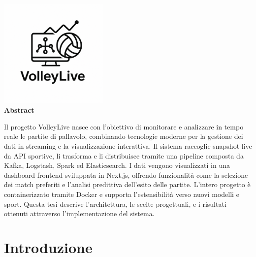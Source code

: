 \documentclass[a4paper,12pt]{report}
\begin{document}
\newpage
\thispagestyle{empty}
\vspace*{2cm}
\begin{center}
    \includegraphics[width=0.4\textwidth]{volleylive-logo.png} \\[1.5cm]
    \textbf{\LARGE Abstract} \\[1cm]
    \begin{minipage}{0.85\textwidth}
        \small
        Il progetto VolleyLive nasce con l’obiettivo di monitorare e analizzare in tempo reale le partite di pallavolo, combinando tecnologie moderne per la gestione dei dati in streaming e la visualizzazione interattiva. Il sistema raccoglie snapshot live da API sportive, li trasforma e li distribuisce tramite una pipeline composta da Kafka, Logstash, Spark ed Elasticsearch. I dati vengono visualizzati in una dashboard frontend sviluppata in Next.js, offrendo funzionalit\`a come la selezione dei match preferiti e l’analisi predittiva dell’esito delle partite. L’intero progetto \`e containerizzato tramite Docker e supporta l’estensibilit\`a verso nuovi modelli e sport. Questa tesi descrive l’architettura, le scelte progettuali, e i risultati ottenuti attraverso l’implementazione del sistema.
    \end{minipage}
\end{center}
\newpage

\tableofcontents
\newpage

\chapter*{Introduzione}
\end{document}
